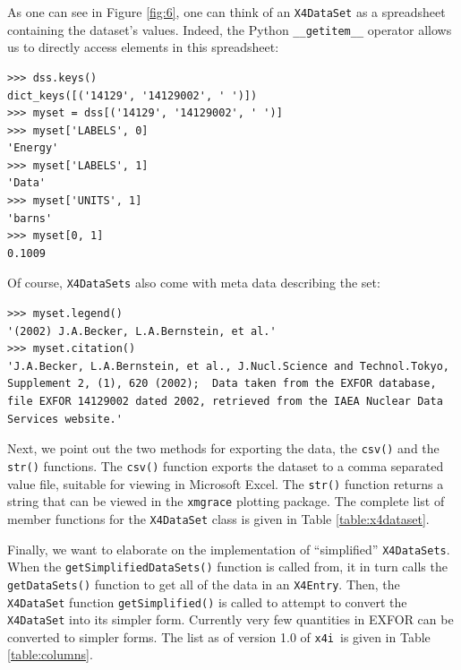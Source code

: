 \documentclass[11pt]{article}
\newcommand{\xfouri}{\texttt{x4i}}
\begin{document}
As one can see in Figure \ref{fig:6}, one can think of an \texttt{X4DataSet} as a spreadsheet containing the dataset's values. Indeed, the Python \texttt{\_\_getitem\_\_} operator allows us to directly access elements in this spreadsheet:
\begin{verbatim}
>>> dss.keys()
dict_keys([('14129', '14129002', ' ')])
>>> myset = dss[('14129', '14129002', ' ')]
>>> myset['LABELS', 0]
'Energy'
>>> myset['LABELS', 1]
'Data'
>>> myset['UNITS', 1]
'barns'
>>> myset[0, 1]
0.1009
\end{verbatim}
Of course, \texttt{X4DataSets} also come with meta data describing the set:
\begin{verbatim}
>>> myset.legend()
'(2002) J.A.Becker, L.A.Bernstein, et al.'
>>> myset.citation()
'J.A.Becker, L.A.Bernstein, et al., J.Nucl.Science and Technol.Tokyo,
Supplement 2, (1), 620 (2002);  Data taken from the EXFOR database,
file EXFOR 14129002 dated 2002, retrieved from the IAEA Nuclear Data
Services website.'
\end{verbatim}
Next, we point out the two methods for exporting the data, the \texttt{csv()} and the \texttt{str()} functions.  The \texttt{csv()} function exports the dataset to a comma separated value file, suitable for viewing in  Microsoft Excel.  The \texttt{str()} function returns a string that can be viewed in the \texttt{xmgrace} plotting package.  The complete list of member functions for the \texttt{X4DataSet} class is given in Table \ref{table:x4dataset}.

Finally, we want to elaborate on the implementation of ``simplified'' \texttt{X4DataSets}.  When the \texttt{getSimplifiedDataSets()} function is called from, it in turn calls the \texttt{getDataSets()} function to get all of the data in an \texttt{X4Entry}.  Then, the \texttt{X4DataSet} function \texttt{getSimplified()} is called to attempt to convert the \texttt{X4DataSet} into its simpler form.  Currently very few quantities in EXFOR can be converted to simpler forms.  The list as of version 1.0 of \xfouri\ is given in Table \ref{table:columns}.
\end{document}
